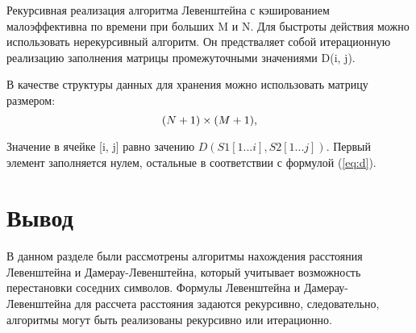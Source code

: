 Рекурсивная реализация алгоритма Левенштейна с кэшированием малоэффективна по времени при больших M и N. Для быстроты
действия можно использовать нерекурсивный алгоритм. Он предстваляет собой итерационную реализацию заполнения матрицы
промежуточными значениями D(i, j).

В качестве структуры данных для хранения можно использовать матрицу размером:
\begin{equation}
	(N + 1)\\\times(M + 1),
\end{equation}

Значение в ячейке [i, j] равно зачению $D(S1[1...i], S2[1...j])$. Первый элемент заполняется нулем, остальные в 
соответствии с формулой (\ref{eq:d}).

\section{Вывод}
В данном разделе были рассмотрены алгоритмы нахождения расстояния Левенштейна и Дамерау-Левенштейна, который 
учитывает возможность перестановки соседних символов. Формулы Левенштейна и Дамерау-Левенштейна для рассчета расстояния
задаются рекурсивно, следовательно, алгоритмы могут быть реализованы рекурсивно или итерационно.

